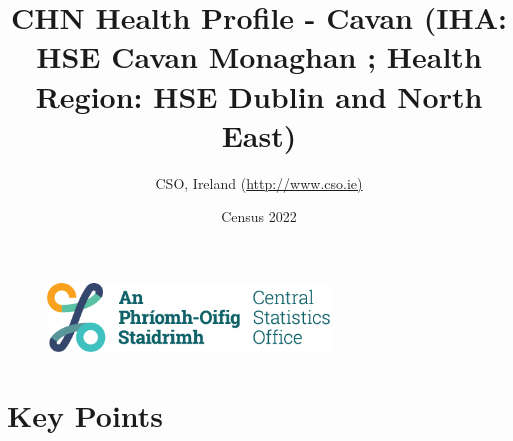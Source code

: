 \documentclass{article}
\title{CHN Health Profile - Cavan (IHA: HSE Cavan Monaghan ;  Health Region: HSE Dublin and North East) }
\date{Census 2022}
\author{CSO, Ireland  (\url{http://www.cso.ie)}}
\begin{document}


\begin{figure}
	\centering
\includegraphics[width =75mm]{../figures/CSO_Logo.png}
\end{figure}

				 
		   
						  
														  
																																													
												 
			 
\maketitle
					
													   
				 
						 
																																																																											   
				 
				  
  \pagebreak
    	    \tableofcontents

\pagebreak


\section{Key Points}
\end{document}
